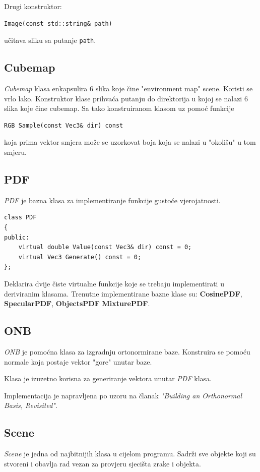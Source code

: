 \documentclass[
12pt, %
oneside, %
english, %
singlespacing, %
parskip, %
headsepline, %
chapterinoneline, %
consistentlayout, %
]{MastersDoctoralThesis} %
\begin{document}
Drugi konstruktor:
\begin{verbatim}
Image(const std::string& path)
\end{verbatim} 
učitava sliku sa putanje \texttt{path}.

\subsection*{Cubemap}
\emph{Cubemap} klasa enkapsulira 6 slika koje čine "environment map" scene. Koristi se vrlo lako.
Konstruktor klase prihvaća putanju do direktorija u kojoj se nalazi 6 slika koje čine cubemap.
Sa tako konstruiranom klasom uz pomoć funkcije
\begin{verbatim}
RGB Sample(const Vec3& dir) const
\end{verbatim}
koja prima vektor smjera može se uzorkovat boja koja se nalazi u "okolišu" u tom smjeru.

\subsection*{PDF}
\emph{PDF} je bazna klasa za implementiranje funkcije gustoće vjerojatnosti.
\begin{verbatim}
class PDF
{
public:
	virtual double Value(const Vec3& dir) const = 0;
	virtual Vec3 Generate() const = 0;
};
\end{verbatim}
Deklarira dvije čiste virtualne funkcije koje se trebaju implementirati u deriviranim klasama.
Trenutne implementirane bazne klase su: \textbf{CosinePDF}, \textbf{SpecularPDF}, \textbf{ObjectsPDF}
\textbf{MixturePDF}.

\subsection*{ONB}
\emph{ONB} je pomoćna klasa za izgradnju ortonormirane baze. Konstruira se pomoću normale koja
postaje vektor "gore" unutar baze.

Klasa je izuzetno korisna za generiranje vektora unutar \emph{PDF} klasa.

Implementacija je napravljena po uzoru na članak \emph{"Building an Orthonormal Basis, Revisited"}\cite{ONBrevisited}.

\subsection*{Scene}
\emph{Scene} je jedna od najbitnijih klasa u cijelom programu. Sadrži sve objekte koji su stvoreni
i obavlja rad vezan za provjeru sjecišta zrake i objekta.
\end{document}
